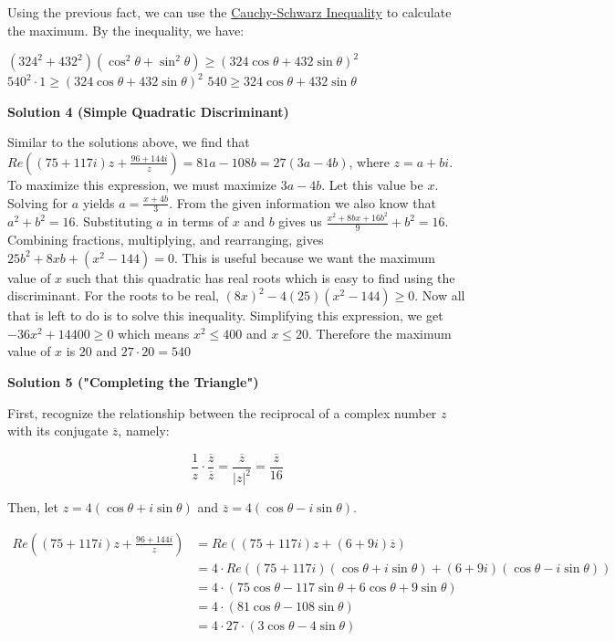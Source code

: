 \begin{enumerate}
 
Using the previous fact, we can use the \href{https://artofproblemsolving.com/wiki/index.php?title=Cauchy-Schwarz\_Inequality}{Cauchy-Schwarz Inequality} to calculate the maximum. By the inequality, we have:

 $(324^2+432^2)(\cos^2\theta+\sin^2\theta)\ge(324\cos\theta+432\sin\theta)^2$
$540^2\cdot1\ge(324\cos\theta+432\sin\theta)^2$
$\boxed{540}\ge324\cos\theta+432\sin\theta$




\textbf{Solution 4 (Simple Quadratic Discriminant)}

Similar to the solutions above, we find that $Re((75+117i)z+\frac{96+144i}{z})=81a-108b=27(3a-4b)$, where $z=a+bi$. To maximize this expression, we must maximize $3a-4b$. Let this value be $x$. Solving for $a$ yields $a=\frac{x+4b}{3}$. From the given information we also know that $a^2+b^2=16$. Substituting $a$ in terms of $x$ and $b$ gives us $\frac{x^2+8bx+16b^2}{9}+b^2=16$. Combining fractions, multiplying, and rearranging, gives $25b^2+8xb+(x^2-144)=0$. This is useful because we want the maximum value of $x$ such that this quadratic has real roots which is easy to find using the discriminant. For the roots to be real, $(8x)^2-4(25)(x^2-144) \ge 0$. Now all that is left to do is to solve this inequality. Simplifying this expression, we get $-36x^2+14400 \ge 0$ which means $x^2 \le 400$ and $x \le 20$. Therefore the maximum value of $x$ is $20$ and $27 \cdot 20 = \boxed{540}$




\textbf{Solution 5 ("Completing the Triangle")}

First, recognize the relationship between the reciprocal of a complex number $z$ with its conjugate $\overline{z}$, namely:

 
 \[\frac{1}{z} \cdot \frac{\overline{z}}{\overline{z}} = \frac{\overline{z}}{|z|^2} = \frac{\overline{z}}{16}\]

 Then, let $z = 4(\cos\theta + i\sin\theta)$ and $\overline{z} = 4(\cos\theta - i\sin\theta)$.

 
 \begin{align*} Re \left ((75+117i)z+\frac{96+144i}{z} \right) &= Re\left ( (75+117i)z + (6+9i)\overline{z}    \right ) \\                                                &= 4 \cdot Re\left ( (75+117i)(\cos\theta + i\sin\theta) + (6+9i)(\cos\theta - i\sin\theta)    \right ) \\                                                &= 4 \cdot (75\cos\theta - 117\sin\theta + 6\cos\theta + 9\sin\theta) \\                                                &= 4 \cdot (81\cos\theta - 108\sin\theta) \\                                                &= 4\cdot 27 \cdot (3\cos\theta - 4\sin\theta) \end{align*}



\end{enumerate}

